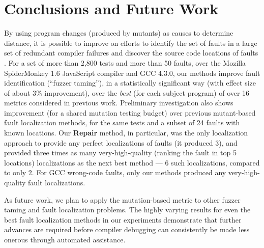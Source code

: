 \section{Conclusions and Future Work}
\label{conc}
 By using program changes
(produced by mutants) as
causes to determine distance, it is possible to improve on efforts
to identify the set of faults in a large set of redundant compiler failures
\cite{PLDI13} and discover the source code locations of faults
\cite{MUSE,multilingual}.  For a set of more than 2,800 tests and more
than 50 faults, over the Mozilla SpiderMonkey 1.6 JavaScript compiler and
GCC 4.3.0, our methods improve fault identification (``fuzzer taming''), in a statistically significant way
(with effect size of about 3\% improvement), over
the \emph{best} (for each subject program) of over 16 metrics considered in previous work.
Preliminary investigation also shows improvement (for a shared
mutation testing budget) over previous mutant-based fault localization
methods, for the same tests and a subset of 24 faults with known
locations.  Our {\bf Repair} method, in particular, was the only
localization approach to provide any perfect localizations of faults
(it produced 3),
and provided three times as many very-high-quality (ranking the fault
in top 5 locations) localizations as the next best method
\cite{multilingual}  --- 6 such localizations, compared to only 2.
For GCC wrong-code faults, only our methods produced any very-high-quality fault localizations.

As future work, we plan to apply the mutation-based metric to other
fuzzer taming and fault localization problems.  The highly varying
results for even the best fault localization methods in our
experiments demonstrate that further advances are required before
compiler debugging can consistently be made less onerous through automated
assistance.  

